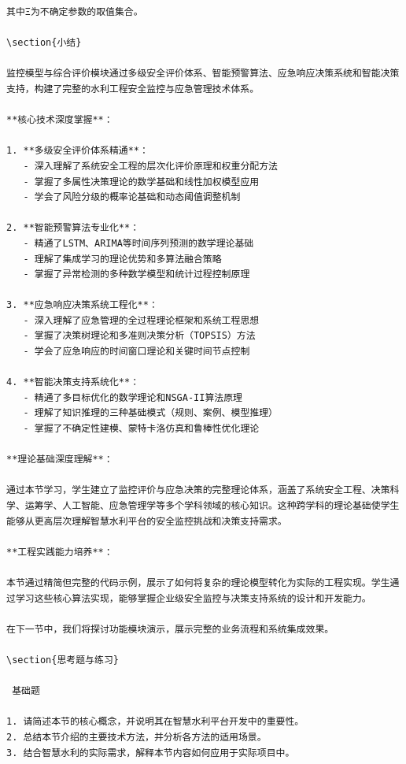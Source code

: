 \begin{lstlisting}
其中Ξ为不确定参数的取值集合。

\section{小结}

监控模型与综合评价模块通过多级安全评价体系、智能预警算法、应急响应决策系统和智能决策支持，构建了完整的水利工程安全监控与应急管理技术体系。

**核心技术深度掌握**：

1. **多级安全评价体系精通**：
   - 深入理解了系统安全工程的层次化评价原理和权重分配方法
   - 掌握了多属性决策理论的数学基础和线性加权模型应用
   - 学会了风险分级的概率论基础和动态阈值调整机制

2. **智能预警算法专业化**：
   - 精通了LSTM、ARIMA等时间序列预测的数学理论基础
   - 理解了集成学习的理论优势和多算法融合策略
   - 掌握了异常检测的多种数学模型和统计过程控制原理

3. **应急响应决策系统工程化**：
   - 深入理解了应急管理的全过程理论框架和系统工程思想
   - 掌握了决策树理论和多准则决策分析（TOPSIS）方法
   - 学会了应急响应的时间窗口理论和关键时间节点控制

4. **智能决策支持系统化**：
   - 精通了多目标优化的数学理论和NSGA-II算法原理
   - 理解了知识推理的三种基础模式（规则、案例、模型推理）
   - 掌握了不确定性建模、蒙特卡洛仿真和鲁棒性优化理论

**理论基础深度理解**：

通过本节学习，学生建立了监控评价与应急决策的完整理论体系，涵盖了系统安全工程、决策科学、运筹学、人工智能、应急管理学等多个学科领域的核心知识。这种跨学科的理论基础使学生能够从更高层次理解智慧水利平台的安全监控挑战和决策支持需求。

**工程实践能力培养**：

本节通过精简但完整的代码示例，展示了如何将复杂的理论模型转化为实际的工程实现。学生通过学习这些核心算法实现，能够掌握企业级安全监控与决策支持系统的设计和开发能力。

在下一节中，我们将探讨功能模块演示，展示完整的业务流程和系统集成效果。

\section{思考题与练习}

 基础题

1. 请简述本节的核心概念，并说明其在智慧水利平台开发中的重要性。
2. 总结本节介绍的主要技术方法，并分析各方法的适用场景。
3. 结合智慧水利的实际需求，解释本节内容如何应用于实际项目中。


\end{lstlisting}
